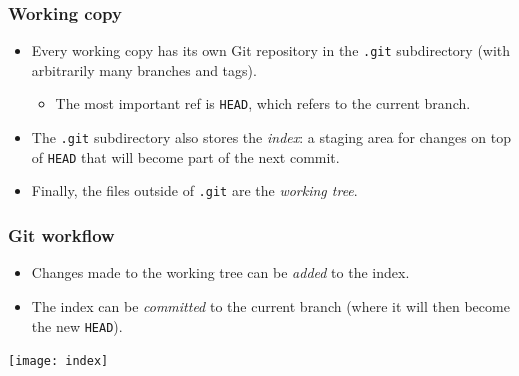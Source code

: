 \documentclass{beamer}
\begin{document}
\begin{frame}
  \frametitle{Working copy}
  \begin{itemize}
  \item Every working copy has its own Git repository in the
    \texttt{.git} subdirectory (with arbitrarily many branches and
    tags).
    \begin{itemize}
    \item The most important ref is \texttt{HEAD}, which refers to the
      current branch.
    \end{itemize}
  \item The \texttt{.git} subdirectory also stores the \emph{index}: a
    staging area for changes on top of \texttt{HEAD} that will become
    part of the next commit.
  \item Finally, the files outside of \texttt{.git} are the
    \emph{working tree}.
  \end{itemize}
\end{frame}

\begin{frame}
  \frametitle{Git workflow}
  \begin{itemize}
  \item Changes made to the working tree can be \emph{added} to the
    index.
  \item The index can be \emph{committed} to the current branch (where
    it will then become the new \texttt{HEAD}).
  \end{itemize}

  \begin{center}
    \texttt{[image: index]}
  \end{center}
\end{frame}
\end{document}
